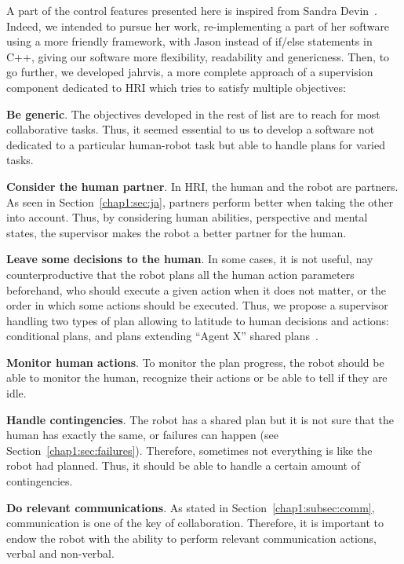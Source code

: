 \documentclass[a4paper,11pt,twoside]{StyleThese}
\begin{document}
A part of the control features presented here is inspired from Sandra Devin~\cite{devin_2017_decisional}. Indeed, we intended to pursue her work, re-implementing a part of her software using a more friendly framework, \ie with Jason instead of if/else statements in C++, giving our software more flexibility, readability and genericness.
Then, to go further, we developed \acrshort{jahrvis}, a more complete approach of a supervision component dedicated to HRI which tries to satisfy multiple objectives:

\begin{bulletList}
	\item \textbf{Be generic}. The objectives developed in the rest of list are to reach for most collaborative tasks. Thus, it seemed essential to us to develop a software not dedicated to a particular human-robot task but able to handle plans for varied tasks. 
	\item \textbf{Consider the human partner}. In HRI, the human and the robot are partners. As seen in Section~\ref{chap1:sec:ja}, partners perform better when taking the other into account. Thus, by considering human abilities, perspective and mental states, the supervisor makes the robot a better partner for the human.
	\item \textbf{Leave some decisions to the human}. In some cases, it is not useful, nay counterproductive that the robot plans all the human action parameters beforehand, who should execute a given action when it does not matter, or the order in which some actions should be executed. Thus, we propose a supervisor handling two types of plan allowing to latitude to human decisions and actions: conditional plans, and plans extending ``Agent X'' shared plans~\cite{devin_2017_decisions}.
	\item \textbf{Monitor human actions}. To monitor the plan progress, the robot should be able to monitor the human, \ie recognize their actions or be able to tell if they are idle.
	\item \textbf{Handle contingencies}. The robot has a shared plan but it is not sure that the human has exactly the same, or failures can happen (see Section~\ref{chap1:sec:failures}). Therefore, sometimes not everything is like the robot had planned. Thus, it should be able to handle a certain amount of contingencies.
	\item \textbf{Do relevant communications}. As stated in Section~\ref{chap1:subsec:comm}, communication is one of the key of collaboration. Therefore, it is important to endow the robot with the ability to perform relevant communication actions, verbal and non-verbal.

\end{bulletList}
\end{document}
